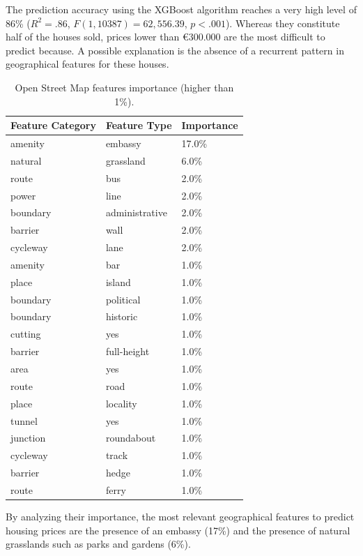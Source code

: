 \documentclass[]{elsarticle} %
\newcommand{\euro}{€}
\begin{document}
The prediction accuracy using the XGBoost algorithm reaches a very high
level of 86\% (\(R^2 = .86\), \(F(1, 10387) = 62,556.39\),
\(p < .001\)). Whereas they constitute half of the houses sold, prices
lower than \euro{}300.000 are the most difficult to predict because. A
possible explanation is the absence of a recurrent pattern in
geographical features for these houses.

\begin{table}[!h]

\caption{\label{tab:OSM-features-table}Open Street Map features importance (higher than 1\%).}
\centering
\fontsize{8}{10}\selectfont
\begin{tabular}{>{\raggedright\arraybackslash}p{1in}>{\raggedright\arraybackslash}p{3in}l}
\toprule
Feature Category & Feature Type & Importance\\
\midrule
amenity & embassy & 17.0\%\\
natural & grassland & 6.0\%\\
route & bus & 2.0\%\\
power & line & 2.0\%\\
boundary & administrative & 2.0\%\\
barrier & wall & 2.0\%\\
cycleway & lane & 2.0\%\\
amenity & bar & 1.0\%\\
place & island & 1.0\%\\
boundary & political & 1.0\%\\
boundary & historic & 1.0\%\\
cutting & yes & 1.0\%\\
barrier & full-height & 1.0\%\\
area & yes & 1.0\%\\
route & road & 1.0\%\\
place & locality & 1.0\%\\
tunnel & yes & 1.0\%\\
junction & roundabout & 1.0\%\\
cycleway & track & 1.0\%\\
barrier & hedge & 1.0\%\\
route & ferry & 1.0\%\\
\bottomrule
\end{tabular}
\end{table}

By analyzing their importance, the most relevant geographical features
to predict housing prices are the presence of an embassy (17\%) and the
presence of natural grasslands such as parks and gardens (6\%).
\end{document}
